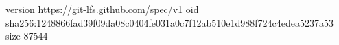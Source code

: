 version https://git-lfs.github.com/spec/v1
oid sha256:1248866fad39f09da08c0404fe031a0c7f12ab510e1d988f724c4edea5237a53
size 87544
